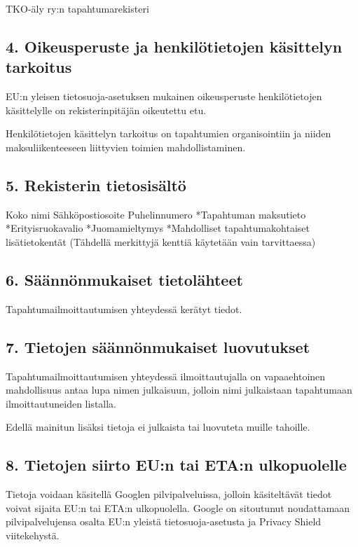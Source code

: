 \documentclass[finnish]{tktltiki}
\begin{document}
TKO-äly ry:n tapahtumarekisteri

\subsection*{4. Oikeusperuste ja henkilötietojen käsittelyn tarkoitus}

EU:n yleisen tietosuoja-asetuksen mukainen oikeusperuste henkilötietojen käsittelylle on
rekisterinpitäjän oikeutettu etu.

Henkilötietojen käsittelyn tarkoitus on tapahtumien organisointiin ja niiden maksuliikenteeseen liittyvien toimien mahdollistaminen.

\subsection*{5. Rekisterin tietosisältö}
Koko nimi
Sähköpostiosoite
Puhelinnumero
*Tapahtuman maksutieto
*Erityisruokavalio
*Juomamieltymys
*Mahdolliset tapahtumakohtaiset lisätietokentät
(Tähdellä merkittyjä kenttiä käytetään vain tarvittaessa)

\subsection*{6. Säännönmukaiset tietolähteet}

Tapahtumailmoittautumisen yhteydessä kerätyt tiedot.

\subsection*{7. Tietojen säännönmukaiset luovutukset}

Tapahtumailmoittautumisen yhteydessä ilmoittautujalla on vapaaehtoinen mahdollisuus antaa lupa nimen julkaisuun, jolloin nimi julkaistaan tapahtumaan ilmoittautuneiden listalla.

Edellä mainitun lisäksi tietoja ei julkaista tai luovuteta muille tahoille.

\subsection*{8. Tietojen siirto EU:n tai ETA:n ulkopuolelle}

Tietoja voidaan käsitellä Googlen pilvipalveluissa, jolloin käsiteltävät tiedot voivat sijaita EU:n tai ETA:n ulkopuolella. Google on sitoutunut noudattamaan pilvipalvelujensa osalta EU:n yleistä tietosuoja-asetusta ja Privacy Shield viitekehystä.
\end{document}
